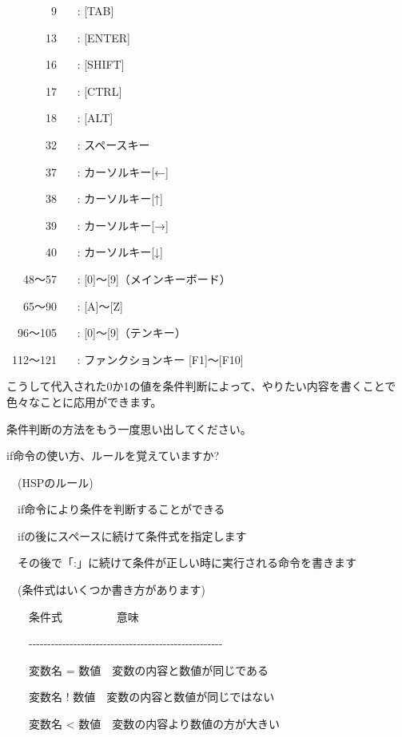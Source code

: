 \documentclass[a4paper,dvipdfmx]{jarticle}
\begin{document}
\ \ \ \ \ \ \ \ 9 \ \ \ : [TAB]

\ \ \ \ \ \ \ 13 \ \ \ : [ENTER]

\ \ \ \ \ \ \ 16 \ \ \ : [SHIFT]

\ \ \ \ \ \ \ 17 \ \ \ : [CTRL]

\ \ \ \ \ \ \ 18 \ \ \ : [ALT]

\ \ \ \ \ \ \ 32 \ \ \ : スペースキー

\ \ \ \ \ \ \ 37 \ \ \ : カーソルキー[←]

\ \ \ \ \ \ \ 38 \ \ \ : カーソルキー[↑]

\ \ \ \ \ \ \ 39 \ \ \ : カーソルキー[→]

\ \ \ \ \ \ \ 40 \ \ \ : カーソルキー[↓]

\ \ \ 48〜57 \ \ \ : [0]〜[9]（メインキーボード）

\ \ \ 65〜90 \ \ \ : [A]〜[Z]

\ \ 96〜105 \ \ \ : [0]〜[9]（テンキー）

\ 112〜121 \ \ \ : ファンクションキー [F1]〜[F10]


\bigskip

こうして代入された0か1の値を条件判断によって、やりたい内容を書くことで色々なことに応用ができます。

条件判断の方法をもう一度思い出してください。

if命令の使い方、ルールを覚えていますか?


\bigskip

\ \ (HSPのルール)


\bigskip

\ \ if命令により条件を判断することができる

\ \ ifの後にスペースに続けて条件式を指定します

\ \ その後で「:」に続けて条件が正しい時に実行される命令を書きます


\bigskip

\ \ (条件式はいくつか書き方があります)


\bigskip

\ \ \ \ 条件式 \ \ \ \ \ \ \ \ \ 意味

\ \ \ \ {}-{}-{}-{}-{}-{}-{}-{}-{}-{}-{}-{}-{}-{}-{}-{}-{}-{}-{}-{}-{}-{}-{}-{}-{}-{}-{}-{}-{}-{}-{}-{}-{}-{}-{}-{}-{}-{}-{}-{}-{}-{}-{}-{}-{}-{}-{}-{}-{}-{}-{}-{}-

\ \ \ \ 変数名 =
数値\ \ 変数の内容と数値が同じである

\ \ \ \ 変数名 !
数値\ \ 変数の内容と数値が同じではない

\ \ \ \ 変数名 {\textless}
数値\ \ 変数の内容より数値の方が大きい
\end{document}
